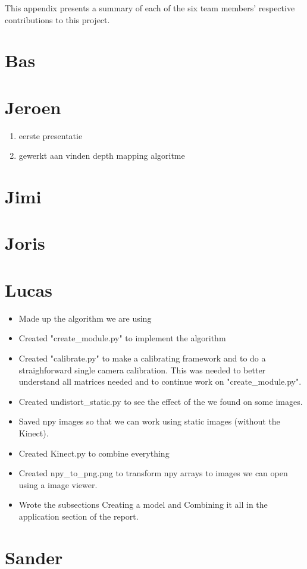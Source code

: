 This appendix presents a summary of each of the six team members' respective
contributions to this project.


\section*{Bas}


\section*{Jeroen}
\begin{enumerate}
\item eerste presentatie
\item gewerkt aan vinden depth mapping algoritme
\end{enumerate}

\section*{Jimi}


\section*{Joris}


\section*{Lucas}
\begin{itemize}
\item Made up the algorithm we are using
\item Created "create\_module.py" to implement the algorithm
\item Created "calibrate.py" to make a calibrating framework and to do a 
straighforward single camera calibration. This was needed to better understand 
all matrices needed and to continue work on "create\_module.py".
\item Created undistort\_static.py to see the effect of the we found on some images.
\item Saved npy images so that we can work using static images (without the Kinect).
\item Created Kinect.py to combine everything
\item Created npy\_to\_png.png to transform npy arrays to images we can open 
using a image viewer.
\item Wrote the subsections Creating a model and Combining it all in the 
application section of the report.
\end{itemize}
\section*{Sander}
